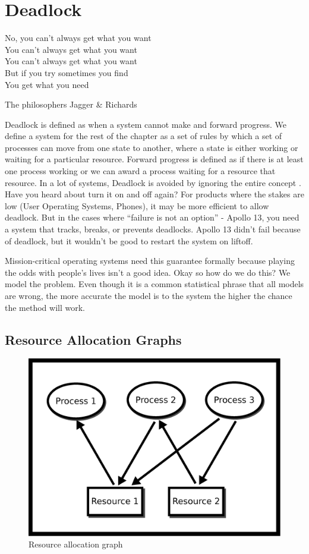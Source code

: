 \chapter{Deadlock}

\epigraph{No, you can't always get what you want
	\\You can't always get what you want
	\\You can't always get what you want
	\\But if you try sometimes you find
	\\You get what you need}{The philosophers Jagger \& Richards}

\gls{Deadlock} is defined as when a system cannot make and forward progress.
We define a system for the rest of the chapter as a set of rules by which a set of processes can move from one state to another, where a state is either working or waiting for a particular resource.
Forward progress is defined as if there is at least one process working or we can award a process waiting for a resource that resource.
In a lot of systems, Deadlock is avoided by ignoring the entire concept \cite[P.237]{silberschatz2006operating}.
Have you heard about turn it on and off again?
For products where the stakes are low (User Operating Systems, Phones), it may be more efficient to allow deadlock.
But in the cases where ``failure is not an option'' - Apollo 13, you need a system that tracks, breaks, or prevents deadlocks.
Apollo 13 didn't fail because of deadlock, but it wouldn't be good to restart the system on liftoff.

Mission-critical operating systems need this guarantee formally because playing the odds with people's lives isn't a good idea.
Okay so how do we do this? We model the problem.
Even though it is a common statistical phrase that all models are wrong, the more accurate the model is to the system the higher the chance the method will work.

\section{Resource Allocation Graphs}

\begin{figure}[H]
	\centering
	\includegraphics[width=.6\textwidth]{deadlock/drawings/rag.eps}
	\caption{Resource allocation graph}
	\label{ragfigure}
\end{figure}

